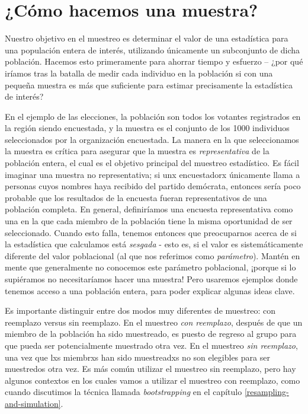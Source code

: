 \documentclass[
  12pt,
]{book}
\begin{document}
\hypertarget{how-do-we-sample}{%
\section{¿Cómo hacemos una muestra?}\label{how-do-we-sample}}

Nuestro objetivo en el muestreo es determinar el valor de una estadística para una populación entera de interés, utilizando únicamente un subconjunto de dicha población. Hacemos esto primeramente para ahorrar tiempo y esfuerzo -- ¿por qué iríamos tras la batalla de medir cada individuo en la población si con una pequeña muestra es más que suficiente para estimar precisamente la estadística de interés?

En el ejemplo de las elecciones, la población son todos los votantes registrados en la región siendo encuestada, y la muestra es el conjunto de los 1000 individuos seleccionados por la organización encuestada. La manera en la que seleccionamos la muestra es crítica para asegurar que la muestra es \emph{representativa} de la población entera, el cual es el objetivo principal del muestreo estadístico. Es fácil imaginar una muestra no representativa; si unx encuestadorx únicamente llama a personas cuyos nombres haya recibido del partido demócrata, entonces sería poco probable que los resultados de la encuesta fueran representativos de una población completa. En general, definiríamos una encuesta representativa como una en la que cada miembro de la población tiene la misma oportunidad de ser seleccionado. Cuando esto falla, tenemos entonces que preocuparnos acerca de si la estadística que calculamos está \emph{sesgada} - esto es, si el valor es sistemáticamente diferente del valor poblacional (al que nos referimos como \emph{parámetro}). Mantén en mente que generalmente no conocemos este parámetro poblacional, ¡porque si lo supiéramos no necesitaríamos hacer una muestra! Pero usaremos ejemplos donde tenemos acceso a una población entera, para poder explicar algunas ideas clave.

Es importante distinguir entre dos modos muy diferentes de muestreo: con reemplazo versus sin reemplazo. En el muestreo \emph{con reemplazo}, después de que un miembro de la población ha sido muestreado, es puesto de regreso al grupo para que pueda ser potencialmente muestrado otra vez. En el muestreo \emph{sin reemplazo}, una vez que lxs miembrxs han sido muestreadxs no son elegibles para ser muestredos otra vez. Es más común utilizar el muestreo sin reemplazo, pero hay algunos contextos en los cuales vamos a utilizar el muestreo con reemplazo, como cuando discutimos la técnica llamada \emph{bootstrapping} en el capítulo \ref{resampling-and-simulation}.
\end{document}
